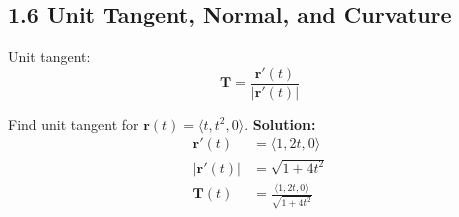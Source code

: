 \subsection*{1.6 Unit Tangent, Normal, and Curvature}

\begin{conceptbox}
    Unit tangent:
    \begin{equation*}
        \mathbf{T} = \frac{\mathbf{r}'(t)}{|\mathbf{r}'(t)|}
    \end{equation*}
\end{conceptbox}

\begin{examplebox}
    Find unit tangent for $\mathbf{r}(t)=\langle t, t^2, 0\rangle$.
    \newline \textbf{Solution:}
    \begin{align*}
        \mathbf{r}'(t)   & = \langle 1, 2t, 0 \rangle                         \\
        |\mathbf{r}'(t)| & = \sqrt{1 + 4t^2}                                  \\
        \mathbf{T}(t)    & = \frac{\langle 1, 2t, 0 \rangle}{\sqrt{1 + 4t^2}}
    \end{align*}
\end{examplebox}
